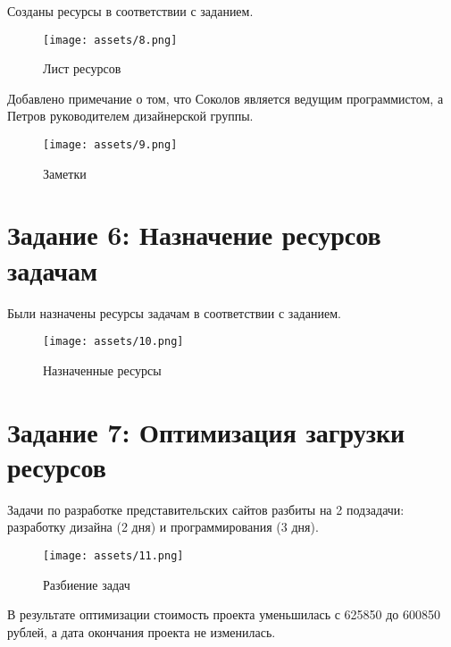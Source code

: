 Созданы ресурсы в соответствии с заданием.

\begin{figure}[H]
    \begin{center}
    \texttt{[image: assets/8.png]}
    \caption{Лист ресурсов}
    \label{fig:8}
    \end{center}
\end{figure}

Добавлено примечание о том, что Соколов является ведущим программистом, а Петров руководителем дизайнерской группы.

\begin{figure}[H]
    \begin{center}
    \texttt{[image: assets/9.png]}
    \caption{Заметки}
    \label{fig:9}
    \end{center}
\end{figure}

\section{Задание 6: Назначение ресурсов задачам}

Были назначены ресурсы задачам в соответствии с заданием.

\begin{figure}[H]
    \begin{center}
    \texttt{[image: assets/10.png]}
    \caption{Назначенные ресурсы}
    \label{fig:10}
    \end{center}
\end{figure}

\section{Задание 7: Оптимизация загрузки ресурсов}

Задачи по разработке представительских сайтов разбиты на 2 подзадачи: разработку дизайна (2 дня) и программирования (3 дня).

\begin{figure}[H]
    \begin{center}
    \texttt{[image: assets/11.png]}
    \caption{Разбиение задач}
    \label{fig:11}
    \end{center}
\end{figure}

В результате оптимизации стоимость проекта уменьшилась с 625850 до 600850 рублей, а дата окончания проекта не изменилась.

